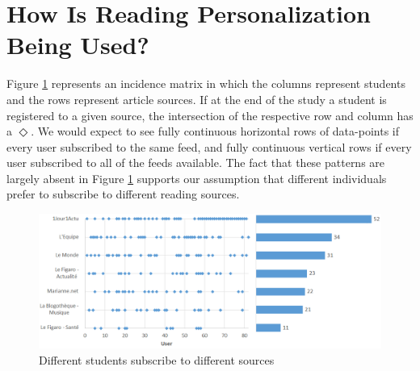 
\newpage
\section{How Is Reading Personalization Being Used?}
\label{sec:results}


Figure \ref{fig:subscriptions} represents an incidence matrix in which the columns represent students and the rows represent article sources. If at the end of the study a student is registered to a given source, the intersection of the respective row and column has a $\Diamond$. 
% 
We would expect to see fully continuous horizontal rows of data-points if every user subscribed to the same feed, and fully continuous vertical rows if every user subscribed to all of the feeds available. The fact that these patterns are largely absent in Figure \ref{fig:subscriptions} supports our assumption that different individuals prefer to subscribe to different reading sources.


\begin{figure}[h!]

\centering
  \includegraphics[width=0.9\columnwidth]{figures/subscription_plot}
  \caption{Different students subscribe to different sources}
  \label{fig:subscriptions}  
\end{figure}

